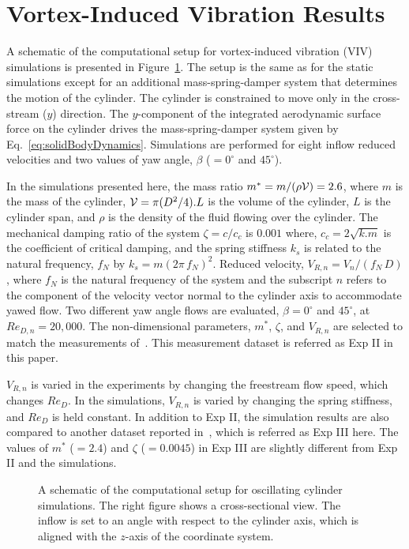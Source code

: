 \section{Vortex-Induced Vibration Results}
\label{sec:VIV}
%
A schematic of the computational setup for vortex-induced vibration (VIV)
simulations is presented in Figure~\ref{fig:VIVmodel}. The setup is the same as
for the static simulations except for an additional mass-spring-damper system
that determines the motion of the cylinder. The cylinder is constrained to move
only in the cross-stream ($y$) direction. The $y$-component of the integrated
aerodynamic surface force on the cylinder drives the mass-spring-damper system
given by Eq.~\ref{eq:solidBodyDynamics}. Simulations are performed for eight
inflow reduced velocities and two values of yaw angle, $\beta$ ($=0^\circ$ and
$45^\circ$).
 
In the simulations presented here, the mass ratio $m^*=m/(\rho {\cal V})=2.6$,
where $m$ is the mass of the cylinder, ${\cal V}=\pi (D^2/4) . L$ is the volume
of the cylinder, $L$ is the cylinder span, and $\rho$ is the density of the
fluid flowing over the cylinder. The mechanical damping ratio of the system
$\zeta = c/c_c$ is $0.001$ where, $c_c=2\sqrt{k.m}$ is the coefficient of
critical damping, and the spring stiffness $k_s$ is related to the natural
frequency, $f_N$ by $k_s=m(2\pi\,f_N)^2$.  Reduced velocity, $V_{R,n} =
V_n/(f_N\,D)$, where $f_N$ is the natural frequency of the system and the
subscript $n$ refers to the component of the velocity vector normal to the
cylinder axis to accommodate yawed flow. Two different yaw angle flows are
evaluated, $\beta=0^\circ$ and $45^\circ$, at $Re_{D,n}=20,000$. The
non-dimensional parameters, $m^*$, $\zeta$, and $V_{R,n}$ are selected to match
the measurements of~\citet{franzini2013one}. This measurement dataset is
referred as Exp II in this paper. 

$V_{R,n}$ is varied in the experiments by changing the freestream flow speed,
which changes $Re_D$. In the simulations, $V_{R,n}$ is varied by changing the
spring stiffness, and $Re_D$ is held constant. In addition to Exp II, the
simulation results are also compared to another dataset reported
in~\cite{khalak1997fluid}, which is referred as Exp III here. The values of
$m^*$ ($=2.4$) and $\zeta$ ($=0.0045$) in Exp III are slightly different from
Exp II and the simulations. 
%
\begin{figure}[htb!]
  \caption{A schematic of the computational setup for oscillating cylinder
    simulations. The right figure shows a cross-sectional view. The inflow is set
    to an angle with respect to the cylinder axis, which is aligned with the
    $z$-axis of the coordinate system.}
  \label{fig:VIVmodel}
\end{figure}

